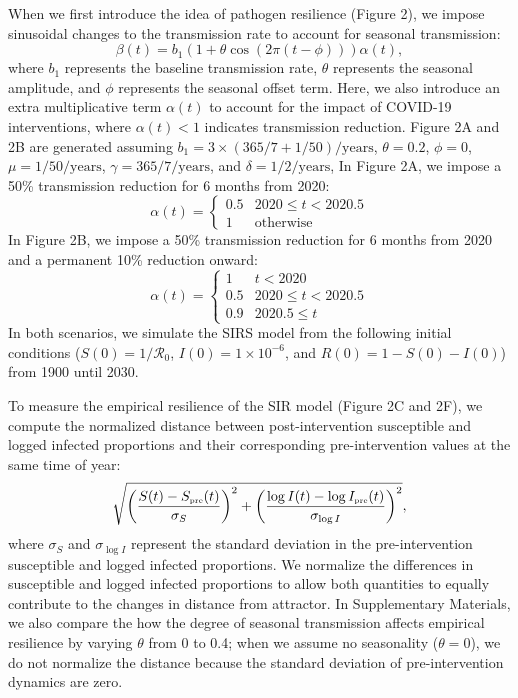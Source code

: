 \documentclass[12pt]{article}
\newcommand{\tsub}[2]{#1_{{\textrm{\tiny #2}}}}
\begin{document}
When we first introduce the idea of pathogen resilience (Figure 2), we impose sinusoidal changes to the transmission rate to account for seasonal transmission:
\begin{equation}
\beta(t) = b_1 (1 + \theta \cos(2 \pi (t-\phi))) \alpha(t),
\end{equation}
where $b_1$ represents the baseline transmission rate, $\theta$ represents the seasonal amplitude, and $\phi$ represents the seasonal offset term.
Here, we also introduce an extra multiplicative term $\alpha(t)$ to account for the impact of COVID-19 interventions, where $\alpha(t) < 1$ indicates transmission reduction.
Figure 2A and 2B are generated assuming $b_1 = 3 \times (365/7+1/50)/\mathrm{years}$, $\theta=0.2$, $\phi=0$, $\mu=1/50/\mathrm{years}$, $\gamma=365/7/\mathrm{years}$, and $\delta=1/2/\mathrm{years}$,
In Figure 2A, we impose a 50\% transmission reduction for 6 months from 2020:
\begin{equation}
\alpha(t) = \begin{cases}
0.5 & 2020 \leq t< 2020.5\\
1 & \textrm{otherwise}
\end{cases}
\end{equation}
In Figure 2B, we impose a 50\% transmission reduction for 6 months from 2020 and a permanent 10\% reduction onward:
\begin{equation}
\alpha(t) = \begin{cases}
1 & t < 2020\\
0.5 & 2020 \leq t < 2020.5\\
0.9 & 2020.5 \leq t
\end{cases}
\end{equation}
In both scenarios, we simulate the SIRS model from the following initial conditions ($S(0) = 1/\mathcal R_0$, $I(0) = 1\times 10^{-6}$, and $R(0) = 1 - S(0) - I(0)$) from 1900 until 2030.

To measure the empirical resilience of the SIR model (Figure 2C and 2F), we compute the normalized distance between post-intervention susceptible and logged infected proportions and their corresponding pre-intervention values at the same time of year:
\begin{equation}
\sqrt{\left(\frac{S(t) - \tsub{S}{pre}(t)}{\sigma_S}\right)^2 + \left(\frac{\log I(t) - \log \tsub{I}{pre}(t)}{\sigma_{\log I}}\right)^2},
\end{equation}
where $\sigma_S$ and $\sigma_{\log I}$ represent the standard deviation in the pre-intervention susceptible and logged infected proportions.
We normalize the differences in susceptible and logged infected proportions to allow both quantities to equally contribute to the changes in distance from attractor.
In Supplementary Materials, we also compare the how the degree of seasonal transmission affects empirical resilience by varying $\theta$ from 0 to 0.4; when we assume no seasonality ($\theta = 0$), we do not normalize the distance because the standard deviation of pre-intervention dynamics are zero. 
\end{document}
